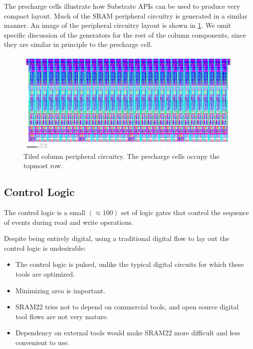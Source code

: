 The precharge cells illustrate how Substrate APIs can be used to produce very compact layout.
Much of the SRAM peripheral circuitry is generated in a similar manner. An image of the peripheral circuitry layout
is shown in \ref{fig:peripheral-circuitry-layout}. We omit specific discussion of the generators for the rest of the column
components, since they are similar in principle to the precharge cell.

\begin{figure}[H] \centering
\includegraphics[width=\textwidth]{figures/col_peripherals.png}
\caption{Tiled column peripheral circuitry. The precharge cells occupy the topmost row. \label{fig:peripheral-circuitry-layout}}
\end{figure}

\subsection{Control Logic} \label{sec:control-logic-layout}

The control logic is a small $\left( \approx 100\right)$ set of logic gates that control the sequence of events during read and write operations.

Despite being entirely digital, using a traditional digital flow to lay out the control logic is undesirable:
\begin{itemize}
\item The control logic is pulsed, unlike the typical digital circuits for which these tools are optimized.
\item Minimizing area is important.
\item SRAM22 tries not to depend on commercial tools, and open source digital tool flows are not very mature.
\item Dependency on external tools would make SRAM22 more difficult and less convenient to use.
\end{itemize}


